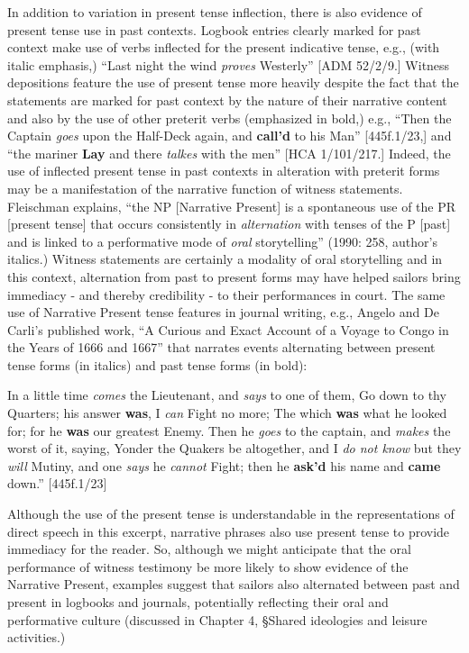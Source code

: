 In addition to variation in present tense inflection, there is also evidence of present tense use in past contexts. Logbook entries clearly marked for past context make use of verbs inflected for the present indicative tense, e.g., (with italic emphasis,) “Last night the wind \textit{proves} Westerly” [ADM 52/2/9.] Witness depositions feature the use of present tense more heavily despite the fact that the statements are marked for past context by the nature of their narrative content and also by the use of other preterit verbs (emphasized in bold,) e.g., “Then the Captain \textit{goes} upon the Half-Deck again, and \textbf{call’d} to his Man” [445f.1/23,] and “the mariner \textbf{Lay} and there \textit{talkes} with the men” [HCA 1/101/217.] Indeed, the use of inflected present tense in past contexts in alteration with preterit forms may be a manifestation of the narrative function of witness statements. Fleischman explains, “the NP [Narrative Present] is a spontaneous use of the PR [present tense] that occurs consistently in \textit{alternation} with tenses of the P [past] and is linked to a performative mode of \textit{oral} storytelling” (1990: 258, author’s italics.) Witness statements are certainly a modality of oral storytelling and in this context, alternation from past to present forms may have helped sailors bring immediacy - and thereby credibility - to their performances in court. The same use of Narrative Present tense features in journal writing, e.g., Angelo and De Carli’s published work, “A Curious and Exact Account of a Voyage to Congo in the Years of 1666 and 1667” that narrates events alternating between present tense forms (in italics) and past tense forms (in bold):

In a little time \textit{comes} the Lieutenant, and \textit{says} to one of them, Go down to thy Quarters; his answer \textbf{was}, I \textit{can} Fight no more; The which \textbf{was} what he looked for; for he \textbf{was} our greatest Enemy. Then he \textit{goes} to the captain, and \textit{makes} the worst of it, saying, Yonder the Quakers be altogether, and I \textit{do not know} but they \textit{will} Mutiny, and one \textit{says} he \textit{cannot} Fight; then he \textbf{ask’d} his name and \textbf{came} down.” [445f.1/23]

Although the use of the present tense is understandable in the representations of direct speech in this excerpt, narrative phrases also use present tense to provide immediacy for the reader. So, although we might anticipate that the oral performance of witness testimony be more likely to show evidence of the Narrative Present, examples suggest that sailors also alternated between past and present in logbooks and journals, potentially reflecting their oral and performative culture (discussed in Chapter 4, §Shared ideologies and leisure activities.) 

